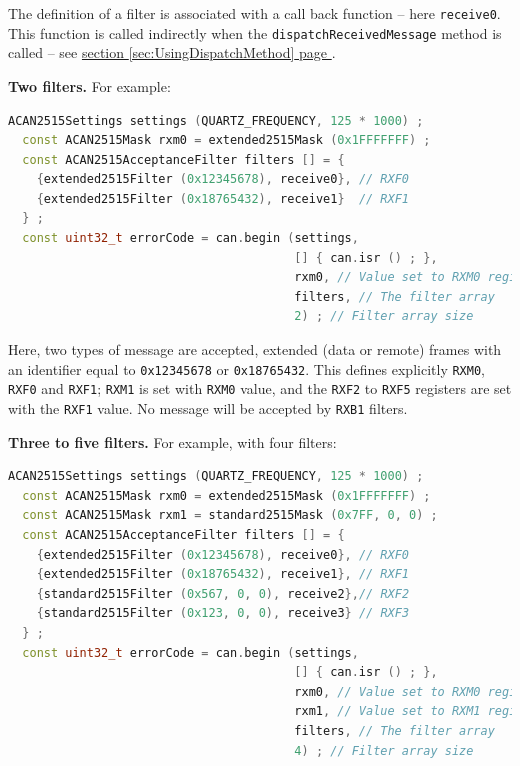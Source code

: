 \documentclass[10pt, a4paper, obeyspaces, openany]{extarticle}
\newcommand\refSectionPage[1]{\hyperref[sec:#1]{section \ref*{sec:#1} page \pageref{sec:#1}}}
\begin{document}
The definition of a filter is associated with a call back function -- here \texttt{receive0}. This function is called indirectly when the \texttt{dispatchReceivedMessage} method is called -- see \refSectionPage{UsingDispatchMethod}.








{\bf Two filters.} For example:
{ \small\begin{lstlisting}[language=c++]
  ACAN2515Settings settings (QUARTZ_FREQUENCY, 125 * 1000) ;
  const ACAN2515Mask rxm0 = extended2515Mask (0x1FFFFFFF) ;
  const ACAN2515AcceptanceFilter filters [] = {
    {extended2515Filter (0x12345678), receive0}, // RXF0
    {extended2515Filter (0x18765432), receive1}  // RXF1
  } ;
  const uint32_t errorCode = can.begin (settings,
                                        [] { can.isr () ; },
                                        rxm0, // Value set to RXM0 register
                                        filters, // The filter array
                                        2) ; // Filter array size
\end{lstlisting}}

Here, two types of message are accepted, extended (data or remote) frames with an identifier equal to \texttt{0x12345678} or \texttt{0x18765432}. This defines explicitly \texttt{RXM0}, \texttt{RXF0} and \texttt{RXF1}; \texttt{RXM1} is set with \texttt{RXM0} value, and the \texttt{RXF2} to \texttt{RXF5} registers are set with the \texttt{RXF1} value. No message will be accepted by \texttt{RXB1} filters.










{\bf Three to five filters.} For example, with four filters:
{ \small\begin{lstlisting}[language=c++]
  ACAN2515Settings settings (QUARTZ_FREQUENCY, 125 * 1000) ;
  const ACAN2515Mask rxm0 = extended2515Mask (0x1FFFFFFF) ;
  const ACAN2515Mask rxm1 = standard2515Mask (0x7FF, 0, 0) ;
  const ACAN2515AcceptanceFilter filters [] = {
    {extended2515Filter (0x12345678), receive0}, // RXF0
    {extended2515Filter (0x18765432), receive1}, // RXF1
    {standard2515Filter (0x567, 0, 0), receive2},// RXF2
    {standard2515Filter (0x123, 0, 0), receive3} // RXF3
  } ;
  const uint32_t errorCode = can.begin (settings,
                                        [] { can.isr () ; },
                                        rxm0, // Value set to RXM0 register
                                        rxm1, // Value set to RXM1 register
                                        filters, // The filter array
                                        4) ; // Filter array size
\end{lstlisting}}
\end{document}
